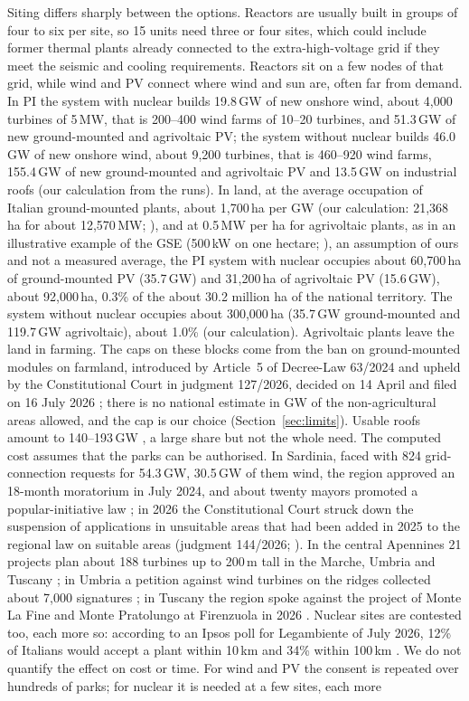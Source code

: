 Siting differs sharply between the options. Reactors are usually built in groups of four to six per site, so 15 units need three or four sites, which could include former thermal plants already connected to the extra-high-voltage grid if they meet the seismic and cooling requirements. Reactors sit on a few nodes of that grid, while wind and PV connect where wind and sun are, often far from demand. In PI the system with nuclear builds 19.8\,GW of new onshore wind, about 4{,}000 turbines of 5\,MW, that is 200--400 wind farms of 10--20 turbines, and 51.3\,GW of new ground-mounted and agrivoltaic PV; the system without nuclear builds 46.0\,GW of new onshore wind, about 9{,}200 turbines, that is 460--920 wind farms, 155.4\,GW of new ground-mounted and agrivoltaic PV and 13.5\,GW on industrial roofs (our calculation from the runs). In land, at the average occupation of Italian ground-mounted plants, about 1{,}700\,ha per GW (our calculation: 21{,}368\,ha for about 12{,}570\,MW; \citealp{ISPRA2026}), and at 0.5\,MW per ha for agrivoltaic plants, as in an illustrative example of the GSE (500\,kW on one hectare; \citealp{GSEAgri2024}), an assumption of ours and not a measured average, the PI system with nuclear occupies about 60{,}700\,ha of ground-mounted PV (35.7\,GW) and 31{,}200\,ha of agrivoltaic PV (15.6\,GW), about 92{,}000\,ha, 0.3\% of the about 30.2 million ha of the national territory. The system without nuclear occupies about 300{,}000\,ha (35.7\,GW ground-mounted and 119.7\,GW agrivoltaic), about 1.0\% (our calculation). Agrivoltaic plants leave the land in farming. The caps on these blocks come from the ban on ground-mounted modules on farmland, introduced by Article~5 of Decree-Law 63/2024 and upheld by the Constitutional Court in judgment 127/2026, decided on 14 April and filed on 16 July 2026 \citep{Corte127}; there is no national estimate in GW of the non-agricultural areas allowed, and the cap is our choice (Section~\ref{sec:limits}). Usable roofs amount to 140--193\,GW \citep{ISPRA2026}, a large share but not the whole need. The computed cost assumes that the parks can be authorised. In Sardinia, faced with 824 grid-connection requests for 54.3\,GW, 30.5\,GW of them wind, the region approved an 18-month moratorium in July 2024, and about twenty mayors promoted a popular-initiative law \citep{IlPostSardinia2024}; in 2026 the Constitutional Court struck down the suspension of applications in unsuitable areas that had been added in 2025 to the regional law on suitable areas (judgment 144/2026; \citealp{Corte144,Indip2026}). In the central Apennines 21 projects plan about 188 turbines up to 200\,m tall in the Marche, Umbria and Tuscany \citep{Indip2025}; in Umbria a petition against wind turbines on the ridges collected about 7{,}000 signatures \citep{UmbriaPetition2025}; in Tuscany the region spoke against the project of Monte La Fine and Monte Pratolungo at Firenzuola in 2026 \citep{Pressenza2026}. Nuclear sites are contested too, each more so: according to an Ipsos poll for Legambiente of July 2026, 12\% of Italians would accept a plant within 10\,km and 34\% within 100\,km \citep{QuiFinanza2026}. We do not quantify the effect on cost or time. For wind and PV the consent is repeated over hundreds of parks; for nuclear it is needed at a few sites, each more 